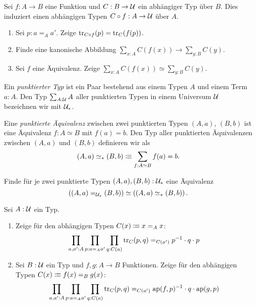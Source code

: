 \documentclass{uebung}
\begin{document}

\begin{exercise}
  Sei $f:A \to B$ eine Funktion und $C : B \to \mathcal{U}$ ein abhängiger Typ über $B$.
  Dies induziert einen abhängigen Typen $C \circ f : A \to \mathcal{U}$ über $A$.
  \begin{enumerate}
    \item Sei $p:a=_A a'$. 
      Zeige $\mathrm{tr}_{C\circ f}(p) = \mathrm{tr}_C (f(p))$.
    \item Finde eine kanonische Abbildung $\sum_{x:A} C(f(x)) \to \sum_{y:B} C(y)$.
    \item Sei $f$ eine Äquivalenz.
      Zeige $\sum_{x:A} C(f(x)) \simeq \sum_{y:B} C(y)$.
  \end{enumerate}
\end{exercise}

\begin{exercise}
  Ein \emph{punktierter Typ} ist ein Paar bestehend aus einem Typen $A$ und einem Term $a:A$.
  Den Typ $\sum_{A:\mathcal{U}}A$ aller punktierten Typen in einem Universum $\mathcal{U}$ bezeichnen wir mit $\mathcal{U}_*$.

  Eine \emph{punktierte Äquivalenz} zwischen zwei punktierten Typen $(A,a)$, $(B,b)$ ist eine Äquivalenz $f:A\simeq B$ mit $f(a)=b$.
  Den Typ aller punktierten Äquivalenzen zwischen $(A,a)$ und $(B,b)$ definieren wir als
  $$
  (A,a) \simeq_* (B,b) \vcentcolon\mspace{-1.2mu}\equiv \sum_{f:A\simeq B} f(a) = b.
  $$

  Finde für je zwei punktierte Typen $(A,a), (B,b) : \mathcal{U}_*$ eine Äquivalenz
  $$
  \left((A,a) =_{\mathcal{U}_*} (B,b)\right) \simeq \left((A,a) \simeq_* (B,b)\right).
  $$
\end{exercise}

\begin{exercise}
  Sei $A:\mathcal{U}$ ein Typ.
  \begin{enumerate}
    \item Zeige für den abhängigen Typen $C(x)\vcentcolon\mspace{-1.2mu}\equiv x =_A x$:
      $$
      \prod_{a,a':A}\prod_{p:a =_A a'} \prod_{q:C(a)} \mathrm{tr}_C (p,q) =_{C(a')} p^{-1} \cdot q \cdot p
      $$
    \item Sei $B:\mathcal{U}$ ein Typ und $f,g : A \to B$ Funktionen.
      Zeige für den abhängigen Typen $C(x) \vcentcolon\mspace{-1.2mu}\equiv f(x)=_{B} g(x)$:
      $$
      \prod_{a,a':A}\prod_{p:a =_A a'} \prod_{q:C(a)} \mathrm{tr}_C (p,q) =_{C(a')} \mathrm{ap}(f,p)^{-1} \cdot q \cdot \mathrm{ap}(g,p)
      $$
  \end{enumerate}
\end{exercise}
\end{document}
